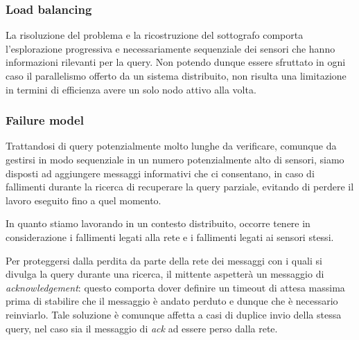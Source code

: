 \documentclass{llncs}
\begin{document}
\subsubsection*{Load balancing}
La risoluzione del problema e la ricostruzione del sottografo
comporta l'esplorazione progressiva e necessariamente sequenziale
dei sensori che hanno informazioni rilevanti per la query.
Non potendo dunque essere sfruttato in ogni caso il parallelismo
offerto da un sistema distribuito, non risulta una limitazione
in termini di efficienza avere un solo nodo attivo alla volta.

\subsubsection*{Failure model}
Trattandosi di query potenzialmente molto lunghe da verificare,
comunque da gestirsi in modo sequenziale in un numero potenzialmente
alto di sensori,
siamo disposti ad aggiungere messaggi informativi che ci consentano,
in caso di fallimenti durante la ricerca di recuperare la query parziale,
evitando di perdere il lavoro eseguito fino a quel momento.

In quanto stiamo lavorando in un contesto distribuito,
occorre tenere in considerazione i fallimenti legati alla rete e i
fallimenti legati ai sensori stessi.

Per proteggersi dalla perdita da parte della rete dei messaggi
con i quali si divulga la query durante una ricerca,
il mittente aspetterà un messaggio di \emph{acknowledgement}: questo
comporta dover definire un timeout di attesa massima prima di
stabilire che il messaggio è andato perduto e dunque che è necessario
reinviarlo. Tale soluzione è comunque affetta a casi di duplice invio
della stessa query, nel caso sia il messaggio di \emph{ack} ad
essere perso dalla rete.
\end{document}
